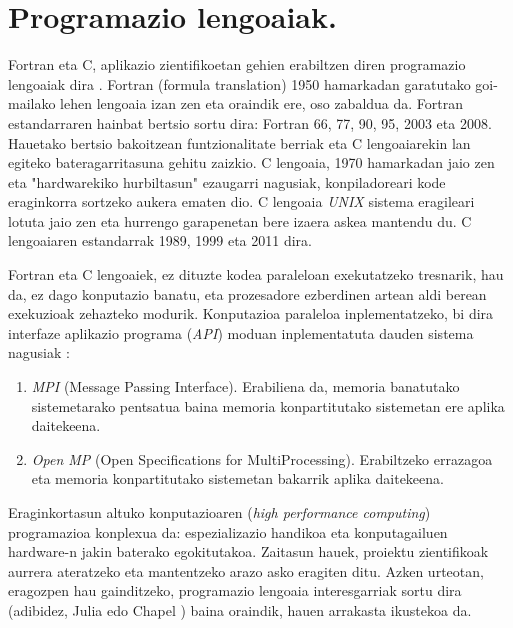 \section{Programazio lengoaiak.}

Fortran eta C, aplikazio zientifikoetan gehien erabiltzen diren programazio lengoaiak dira \cite{Higham2015}. Fortran (formula translation) 1950 hamarkadan garatutako goi-mailako lehen lengoaia izan zen eta oraindik ere, oso zabaldua da. Fortran estandarraren hainbat bertsio 
sortu dira: Fortran 66, 77, 90, 95, 2003 eta 2008. Hauetako bertsio bakoitzean funtzionalitate berriak  eta C lengoaiarekin lan egiteko bateragarritasuna gehitu zaizkio.  C lengoaia, 1970 hamarkadan jaio zen eta "hardwarekiko hurbiltasun" ezaugarri nagusiak, konpiladoreari kode eraginkorra sortzeko aukera ematen dio. C lengoaia \emph{UNIX} sistema eragileari lotuta jaio zen eta hurrengo garapenetan bere izaera askea mantendu du. C lengoaiaren estandarrak 1989, 1999 eta 2011 dira.   

Fortran eta C lengoaiek, ez dituzte kodea paraleloan exekutatzeko tresnarik, hau da, ez dago konputazio banatu, eta prozesadore ezberdinen artean aldi berean exekuzioak zehazteko modurik. Konputazioa paraleloa inplementatzeko, bi dira interfaze aplikazio programa (\emph{API}) moduan inplementatuta dauden sistema nagusiak \cite{Pacheco2011}:

\begin{enumerate}
\item  \emph{MPI} (Message Passing Interface).
Erabiliena da, memoria banatutako sistemetarako pentsatua baina memoria konpartitutako sistemetan ere aplika daitekeena.

\item  \emph{Open MP} (Open Specifications for MultiProcessing).
Erabiltzeko errazagoa eta memoria konpartitutako sistemetan bakarrik aplika daitekeena.

\end{enumerate}

Eraginkortasun altuko konputazioaren (\emph{high performance computing}) programazioa konplexua da: espezializazio handikoa  eta konputagailuen hardware-n jakin baterako egokitutakoa. Zaitasun hauek, proiektu zientifikoak aurrera ateratzeko eta mantentzeko arazo asko eragiten ditu. Azken urteotan, eragozpen hau gainditzeko, programazio lengoaia interesgarriak sortu dira (adibidez, Julia \cite{Bezanson2014} edo Chapel \cite{Balaji2015}) baina oraindik, hauen arrakasta ikustekoa da.

